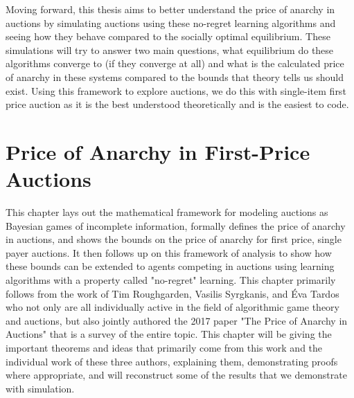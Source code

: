 \documentclass[12pt,twoside]{reedthesis}
\begin{document}
Moving forward, this thesis aims to better understand the price of anarchy in auctions by simulating auctions using these no-regret learning algorithms and seeing how they behave compared to the socially optimal equilibrium. These simulations will try to answer two main questions, what equilibrium do these algorithms converge to (if they converge at all) and what is the calculated price of anarchy in these systems compared to the bounds that theory tells us should exist. Using this framework to explore auctions, we do this with single-item first price auction as it is the best understood theoretically and is the easiest to code. 

\chapter{Price of Anarchy in First-Price Auctions}
This chapter lays out the mathematical framework for modeling auctions as Bayesian games of incomplete information, formally defines the price of anarchy in auctions, and shows the bounds on the price of anarchy for first price, single payer auctions. It then follows up on this framework of analysis to show how these bounds can be extended to agents competing in auctions using learning algorithms with a property called "no-regret" learning. This chapter primarily follows from the work of Tim Roughgarden, Vasilis Syrgkanis, and \'Eva Tardos who not only are all individually active in the field of algorithmic game theory and auctions, but also jointly authored the 2017 paper "The Price of Anarchy in Auctions" that is a survey of the entire topic. This chapter will be giving the important theorems and ideas that primarily come from this work and the individual work of these three authors, explaining them, demonstrating proofs where appropriate, and will reconstruct some of the results that we demonstrate with simulation.   
\end{document}
